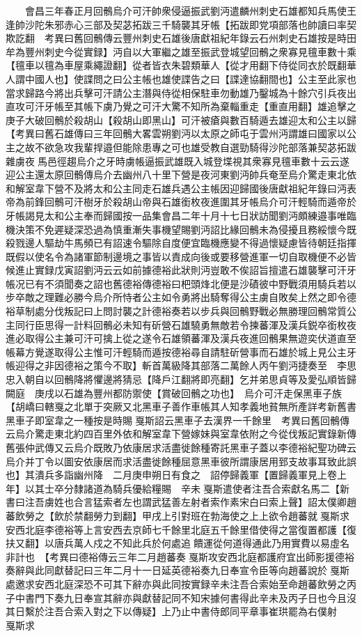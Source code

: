 　　會昌三年春正月回鶻烏介可汗帥衆侵逼振武劉沔遣麟州刺史石雄都知兵馬使王逢帥沙陀朱邪赤心三部及契苾拓跋三千騎襲其牙帳【拓跋即党項部落也帥讀曰率契欺訖翻　考異曰舊回鶻傳云豐州刺史石雄後唐獻祖紀年錄云石州刺史石雄按是時田牟為豐州刺史今從實録】沔自以大軍繼之雄至振武登城望回鶻之衆寡見氊車數十乘【氊車以氊為車屋乘繩證翻】從者皆衣朱碧類華人【從才用翻下侍從同衣於既翻華人謂中國人也】使諜問之曰公主帳也雄使諜告之曰【諜達協翻間也】公主至此家也當求歸路今將出兵擊可汗請公主潛與侍從相保駐車勿動雄乃鑿城為十餘穴引兵夜出直攻可汗牙帳至其帳下虜乃覺之可汗大驚不知所為棄輜重走【重直用翻】雄追擊之庚子大破回鶻於殺胡山【殺胡山即黑山】可汗被瘡與數百騎遁去雄迎太和公主以歸　【考異曰舊石雄傳曰三年回鶻大畧雲朔劉沔以太原之師屯于雲州沔謂雄曰國家以公主之故不欲急攻我輩捍邉但能除患專之可也雄受教自選勁騎得沙陀部落兼契苾拓跋雜虜夜馬邑徑趨烏介之牙時虜帳逼振武雄既入城登堞視其衆寡見氊車數十云云遂迎公主還太原回鶻傳烏介去幽州八十里下營是夜河東劉沔帥兵奄至烏介驚走東北依和解室韋下營不及將太和公主同走石雄兵遇公主帳因迎歸國後唐獻祖紀年錄曰沔表帝為前鋒回鶻可汗樹牙於殺胡山帝與石雄銜枚夜進圍其牙帳烏介可汗輕騎而遁帝於牙帳謁見太和公主奉而歸國按一品集會昌二年十月十七日狀訪聞劉沔頗練邉事唯臨機決策不免遲疑深恐過為慎重漸失事機望賜劉沔詔比緣回鶻未為侵擾且務綏懷今既殺戮邊人驅劫牛馬頻已有詔速令驅除自度便宜臨機應變不得過懷疑慮皆待朝廷指揮既假以使名令為諸軍節制邊境之事皆以責成向後或要移營進軍一切自取機便不必皆候進止實録戊寅詔劉沔云云如前據德裕此狀則沔豈敢不俟詔旨擅遣石雄襲擊可汗牙帳况已有不須聞奏之詔也舊德裕傳德裕曰杷頭烽北便是沙磧彼中野戰須用騎兵若以步卒敵之理難必勝今烏介所恃者公主如令勇將出騎奪得公主虜自敗矣上然之即令德裕草制處分伐叛記曰上問討襲之計德裕奏若以步兵與回鶻野戰必無勝理回鶻常質公主同行臣思得一計料回鶻必未知有斫營石雄驍勇無敵若令揀蕃渾及漢兵鋭卒銜枚夜進必取得公主兼可汗可擒上從之遂令石雄領蕃渾及漢兵夜進回鶻果無遊奕伏道直至帳幕方覺遂取得公主惟可汗輕騎而遁按德裕尋自請駐斫營事而石雄於城上見公主牙帳迎得之非因德裕之策今不取】斬首萬級降其部落二萬餘人丙午劉沔捷奏至　李思忠入朝自以回鶻降將懼邊將猜忌【降戶江翻將即亮翻】乞并弟思貞等及愛弘順皆歸闕庭　庚戌以石雄為豐州都防禦使【賞破回鶻之功也】　烏介可汗走保黑車子族【胡嶠曰轄戛之北單于突厥又北黑車子善作車帳其人知孝義地貧無所產詳考新舊書黑車子即室韋之一種按是時賜戛斯詔云黑車子去漢界一千餘里　考異曰舊回鶻傳云烏介驚走東北約四百里外依和解室韋下營嫁妹與室韋依附之今從伐叛記實錄新傳舊張仲武傳又云烏介既敗乃依康居求活盡徙餘種寄託黑車子蓋以李德裕紀聖功碑云烏介并丁令以圖安依康居而求活盡徙餘種屈意黑車彼所謂康居用郅支故事耳致此誤也】其潰兵多詣幽州降　二月庚申朔日有食之　詔停歸義軍【置歸義軍見上卷上年】以其士卒分隸諸道為騎兵優給糧賜　辛未戛斯遣使者注吾合索獻名馬二【新書曰注吾虜姓也合言猛索者左也謂武猛善左射者索作素宋白曰索上聲】詔太僕卿趙蕃飲勞之【飲於禁翻勞力到翻】甲戌上引對班在勃海使之上上欲令趙蕃就戛斯求安西北庭李德裕等上言安西去京師七千餘里北庭五千餘里借使得之當復置都護【復扶又翻】以唐兵萬人戍之不知此兵於何處追饋運從何道得通此乃用實費以易虛名非計也　【考異曰德裕傳云三年二月趙蕃奏戛斯攻安西北庭都護府宜出師影援德裕奏辭與此同獻替記曰三年二月十一日延英德裕奏九日奉宣令臣等向趙蕃說於戛斯處邀求安西北庭深恐不可其下辭亦與此同按實録辛未注吾合索始至命趙蕃飲勞之丙子中書門下奏九日奉宣其辭亦與獻替記同不知宋據何書得此辛未及丙子日也今且沒其日繫於注吾合索入對之下以傳疑】上乃止中書侍郎同平章事崔珙罷為右僕射　戛斯求

